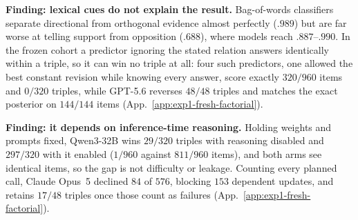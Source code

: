 \documentclass{article}
\begin{document}
\noindent\textbf{Finding: lexical cues do not explain the result.}
Bag-of-words classifiers separate directional from orthogonal evidence almost
perfectly ($.989$) but are far worse at telling support from opposition
($.688$), where models reach $.887$--$.990$. In the frozen cohort a predictor
ignoring the stated relation answers identically within a triple, so it can win
no triple at all: four such predictors, one allowed the best constant revision
while knowing every answer, score exactly $320/960$ items and $0/320$ triples,
while GPT-5.6 reverses $48/48$ triples and matches the exact posterior on
$144/144$ items (App.~\ref{app:exp1-fresh-factorial}).

\noindent\textbf{Finding: it depends on inference-time reasoning.}
Holding weights and prompts fixed, Qwen3-32B wins $29/320$ triples with reasoning
disabled and $297/320$ with it enabled ($1/960$ against $811/960$ items), and
both arms see identical items, so the gap is not difficulty or leakage. Counting every planned call, Claude Opus~5 declined
$84$ of $576$, blocking $153$ dependent updates, and retains $17/48$ triples once
those count as failures (App.~\ref{app:exp1-fresh-factorial}).
\end{document}
